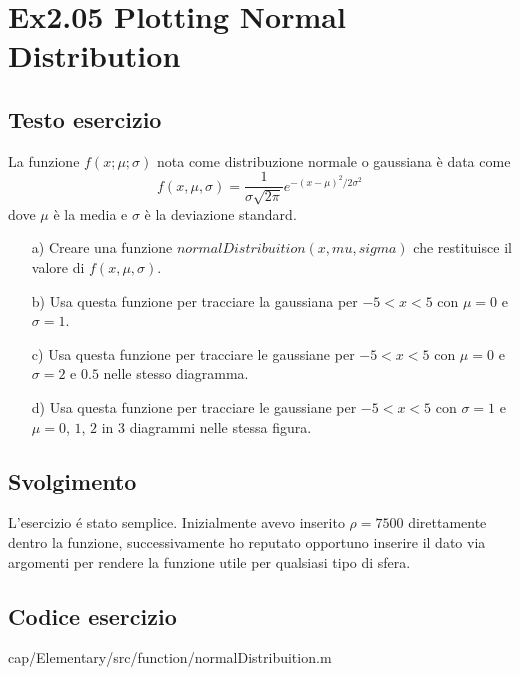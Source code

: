 \section{Ex2.05 Plotting Normal Distribution}\label{sec:NormalDistribution}

\subsection{Testo esercizio}
La funzione $f(x;\mu;\sigma)$ nota come distribuzione normale o gaussiana è 
data come 
$$f(x,\mu,\sigma) = \frac{1}{{\sigma\sqrt{2\pi}}}
e^{{{-\left({x-\mu}\right)^2}/{2\sigma^2}}}$$    
dove $\mu$ è la media e $\sigma$ è la deviazione standard.

\begin{itemize}
    \item[a)] Creare una funzione $normalDistribuition(x,mu,sigma)$ che 
    restituisce il valore di $f(x,\mu,\sigma)$.
    
    \item[b)] Usa questa funzione per tracciare la gaussiana per $-5<x<5$ con 
    $\mu=0$ e $\sigma=1$.
    
    \item[c)] Usa questa funzione per tracciare le gaussiane per $-5<x<5$ con 
    $\mu=0$ e $\sigma=2$ e $0.5$ nelle stesso diagramma.
    
    \item[d)] Usa questa funzione per tracciare le gaussiane per $-5<x<5$ con 
    $\sigma=1$ e $\mu=0$, $1$, $2$ in 3 diagrammi nelle stessa figura.
\end{itemize}
\subsection{Svolgimento}
L'esercizio \'e stato semplice. Inizialmente avevo inserito $\rho=7500$ 
direttamente dentro la funzione, successivamente ho reputato opportuno inserire 
il dato via argomenti per rendere la funzione utile per qualsiasi tipo di sfera.

\subsection{Codice esercizio}

{cap/Elementary/src/function/normalDistribuition.m}
\pagebreak

